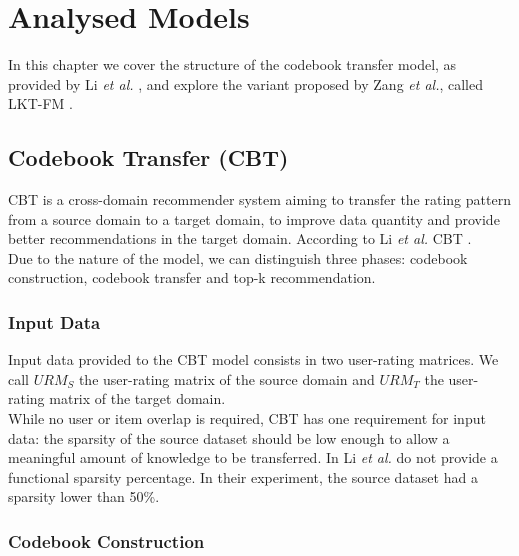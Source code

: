 \chapter{Analysed Models}
\label{ch:analysed-models}

In this chapter we cover the structure of the codebook transfer model, as provided by Li \textit{et al.} \cite{10.5555/1661445.1661773}, and explore the variant proposed by Zang \textit{et al.}, called LKT-FM \cite{10.1007/978-3-319-71246-8_39}.


\section{Codebook Transfer (CBT)}

CBT is a cross-domain recommender system aiming to transfer the rating pattern from a source domain to a target domain, to improve data quantity and provide better recommendations in the target domain. According to Li \textit{et al.} \cite{10.5555/1661445.1661773} CBT .\\
Due to the nature of the model, we can distinguish three phases: codebook construction, codebook transfer and top-k recommendation.


\subsection{Input Data}

Input data provided to the CBT model consists in two user-rating matrices. We call $URM_S$ the user-rating matrix of the source domain and $URM_T$ the user-rating matrix of the target domain.\\
While no user or item overlap is required, CBT has one requirement for input data: the sparsity of the source dataset should be low enough to allow a meaningful amount of knowledge to be transferred. In \cite{10.5555/1661445.1661773} Li \textit{et al.} do not provide a functional sparsity percentage. In their experiment, the source dataset had a sparsity lower than 50\%.


\subsection{Codebook Construction}
\label{ss:codebook-construction}

